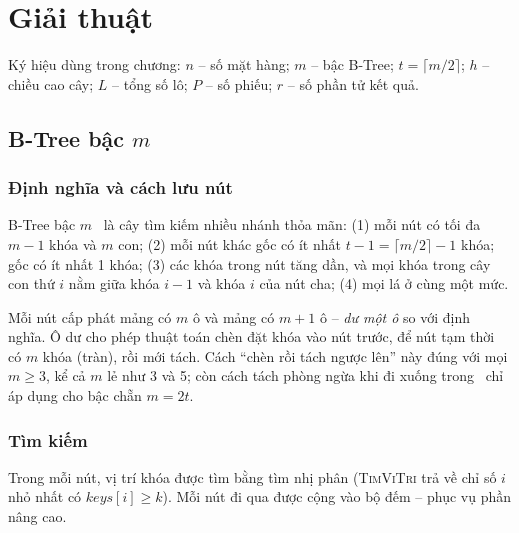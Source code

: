 \chapter{Giải thuật}\label{chap:giaithuat}

Ký hiệu dùng trong chương: $n$ -- số mặt hàng; $m$ -- bậc B-Tree; $t = \lceil m/2\rceil$;
$h$ -- chiều cao cây; $L$ -- tổng số lô; $P$ -- số phiếu; $r$ -- số phần tử kết quả.

\section{B-Tree bậc $m$}\label{sec:btree}

\subsection{Định nghĩa và cách lưu nút}

B-Tree bậc $m$~\cite{bayer,clrs} là cây tìm kiếm nhiều nhánh thỏa mãn:
(1) mỗi nút có tối đa $m-1$ khóa và $m$ con; (2) mỗi nút khác gốc có ít nhất $t-1 = \lceil m/2\rceil-1$ khóa;
gốc có ít nhất 1 khóa; (3) các khóa trong nút tăng dần, và mọi khóa trong cây con thứ $i$ nằm giữa khóa
$i-1$ và khóa $i$ của nút cha; (4) mọi lá ở cùng một mức.

Mỗi nút cấp phát mảng  có $m$ ô và mảng  có $m+1$ ô -- \emph{dư một ô} so với định nghĩa.
Ô dư cho phép thuật toán chèn đặt khóa vào nút trước, để nút tạm thời có $m$ khóa (tràn), rồi mới tách. Cách
``chèn rồi tách ngược lên'' này đúng với mọi $m \ge 3$, kể cả $m$ lẻ như 3 và 5; còn cách tách phòng ngừa
khi đi xuống trong~\cite{clrs} chỉ áp dụng cho bậc chẵn $m = 2t$.

\subsection{Tìm kiếm}

Trong mỗi nút, vị trí khóa được tìm bằng tìm nhị phân (\textsc{TimViTri} trả về chỉ số $i$ nhỏ nhất có
$\mathit{keys}[i] \ge k$). Mỗi nút đi qua được cộng vào bộ đếm  -- phục vụ phần nâng cao.

